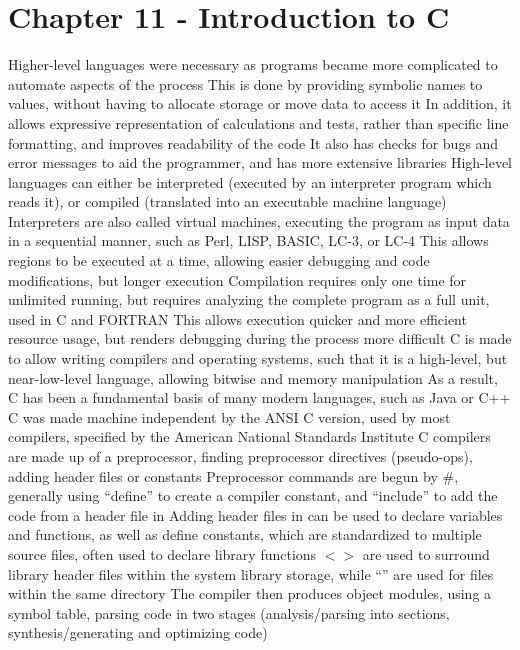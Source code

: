 \documentclass[11 pt, twoside]{article}
\newenvironment{outline*}
{
	\begin{outline}[enumerate]
	}
	{\end{outline}
}
\begin{document}
\section{Chapter 11 - Introduction to C}
\begin{outline*}
\1 Higher-level languages were necessary as programs became more complicated to automate aspects of the process
\2 This is done by providing symbolic names to values, without having to allocate storage or move data to access it
\2 In addition, it allows expressive representation of calculations and tests, rather than specific line formatting, and improves readability of the code
\2 It also has checks for bugs and error messages to aid the programmer, and has more extensive libraries
\1 High-level languages can either be interpreted (executed by an interpreter program which reads it), or compiled (translated into an executable machine language)
\2 Interpreters are also called virtual machines, executing the program as input data in a sequential manner, such as Perl, LISP, BASIC, LC-3, or LC-4
\3 This allows regions to be executed at a time, allowing easier debugging and code modifications, but longer execution
\2 Compilation requires only one time for unlimited running, but requires analyzing the complete program as a full unit, used in C and FORTRAN
\3 This allows execution quicker and more efficient resource usage, but renders debugging during the process more difficult
\1 C is made to allow writing compilers and operating systems, such that it is a high-level, but near-low-level language, allowing bitwise and memory manipulation
\2 As a result, C has been a fundamental basis of many modern languages, such as Java or C++
\2 C was made machine independent by the ANSI C version, used by most compilers, specified by the American National Standards Institute
\1 C compilers are made up of a preprocessor, finding preprocessor directives (pseudo-ops), adding header files or constants
\2 Preprocessor commands are begun by \#, generally using ``define'' to create a compiler constant, and ``include'' to add the code from a header file in
\3 Adding header files in can be used to declare variables and functions, as well as define constants, which are standardized to multiple source files, often used to declare library functions
\3 $<>$ are used to surround library header files within the system library storage, while ``'' are used for files within the same directory
\2 The compiler then produces object modules, using a symbol table, parsing code in two stages (analysis/parsing into sections, synthesis/generating and optimizing code)

\end{outline*}
\end{document}
